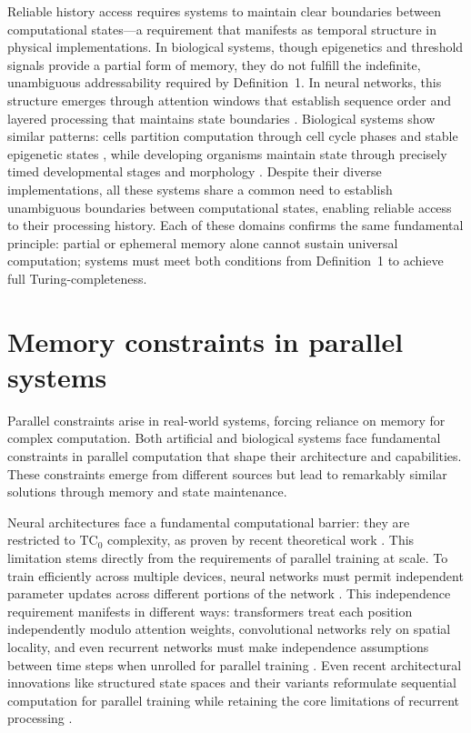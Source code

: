 \documentclass[12pt]{article}
\begin{document}
Reliable history access requires systems to maintain clear boundaries between computational states---a requirement that manifests as temporal structure in physical implementations.
In biological systems, though epigenetics and threshold signals provide a partial form of memory, they do not fulfill the indefinite, unambiguous addressability required by Definition~1. In neural networks, this structure emerges through attention windows that establish sequence order and layered processing that maintains state boundaries \cite{martini2015information,quentin2019differential}.
Biological systems show similar patterns: cells partition computation through cell cycle phases and stable epigenetic states \cite{bruno2022epigenetic}, while developing organisms maintain state through precisely timed developmental stages and morphology \cite{turing1952chemical}.
Despite their diverse implementations, all these systems share a common need to establish unambiguous boundaries between computational states, enabling reliable access to their processing history. Each of these domains confirms the same fundamental principle: partial or ephemeral memory alone cannot sustain universal computation; systems must meet both conditions from Definition~1 to achieve full Turing-completeness.

\section{Memory constraints in parallel systems}

Parallel constraints arise in real-world systems, forcing reliance on memory for complex computation.
Both artificial and biological systems face fundamental constraints in parallel computation that shape their architecture and capabilities.
These constraints emerge from different sources but lead to remarkably similar solutions through memory and state maintenance.

Neural architectures face a fundamental computational barrier: they are restricted to $\text{TC}_0$ complexity, as proven by recent theoretical work \cite{merrill2023parallelism,peng2024limitations}.
This limitation stems directly from the requirements of parallel training at scale.
To train efficiently across multiple devices, neural networks must permit independent parameter updates across different portions of the network \cite{barrett2019analyzing}.
This independence requirement manifests in different ways: transformers treat each position independently modulo attention weights, convolutional networks rely on spatial locality, and even recurrent networks must make independence assumptions between time steps when unrolled for parallel training \cite{bengio2017deep}.
Even recent architectural innovations like structured state spaces and their variants reformulate sequential computation for parallel training while retaining the core limitations of recurrent processing \cite{gu2021efficiently,gu2023mamba,dao2024transformers,nguyen2024hyenadna}.
\end{document}
